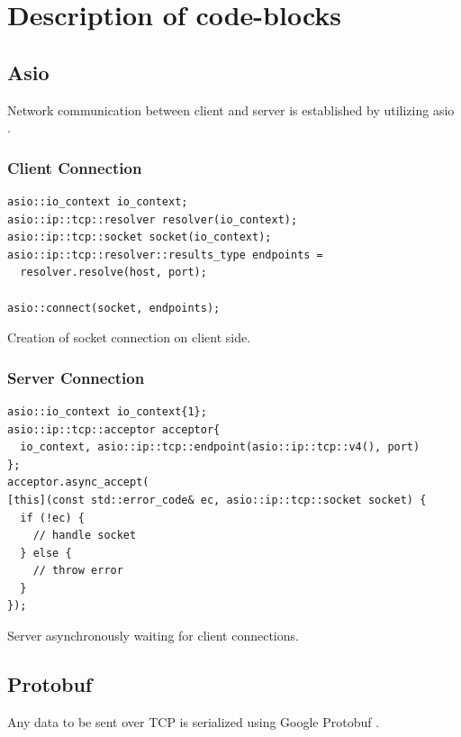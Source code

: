 \documentclass[12pt, letterpaper]{article}
\newenvironment{code}{\captionsetup{type=listing}}{}
\begin{document}
\section{Description of code-blocks}


\subsection{Asio}
Network communication between client and server is established by utilizing asio \cite{asio}.

\subsubsection{Client Connection}

\begin{code}
	\begin{verbatim}
asio::io_context io_context;
asio::ip::tcp::resolver resolver(io_context);
asio::ip::tcp::socket socket(io_context);
asio::ip::tcp::resolver::results_type endpoints = 
  resolver.resolve(host, port);

asio::connect(socket, endpoints);

	\end{verbatim}
	\caption{Creation of socket connection on client side.}
	\label{clientConnection}
\end{code}


\subsubsection{Server Connection}

\begin{code}
	\begin{verbatim}
asio::io_context io_context{1};
asio::ip::tcp::acceptor acceptor{
  io_context, asio::ip::tcp::endpoint(asio::ip::tcp::v4(), port)
};
acceptor.async_accept(
[this](const std::error_code& ec, asio::ip::tcp::socket socket) {
  if (!ec) {
    // handle socket
  } else {
    // throw error
  }
});
	\end{verbatim}
	\caption{Server asynchronously waiting for client connections.}
	\label{serverConnection}
\end{code}

\subsection{Protobuf}
Any data to be sent over TCP is serialized using Google Protobuf \cite{protobuf}.
\newline
\end{document}
